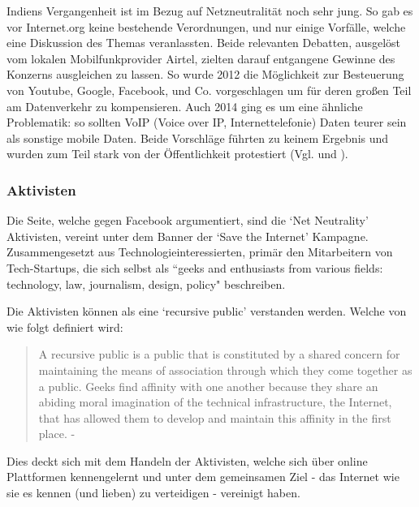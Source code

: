 \documentclass{article}
\begin{document}
\medskip

Indiens Vergangenheit ist im Bezug auf Netzneutralität noch sehr jung. So gab es vor Internet.org keine bestehende Verordnungen, und nur einige Vorfälle, welche eine Diskussion des Themas veranlassten.
Beide relevanten Debatten, ausgelöst vom lokalen Mobilfunkprovider Airtel, zielten darauf entgangene Gewinne des Konzerns ausgleichen zu lassen.
So wurde 2012 die Möglichkeit zur Besteuerung von Youtube, Google, Facebook, und Co. vorgeschlagen um für deren großen Teil am Datenverkehr zu kompensieren.
Auch 2014 ging es um eine ähnliche Problematik: so sollten VoIP (Voice over IP, Internettelefonie) Daten teurer sein als sonstige mobile Daten.
Beide Vorschläge führten zu keinem Ergebnis und wurden zum Teil stark von der Öffentlichkeit protestiert (Vgl. \textcite[253]{everydayLife} und \textcite{airtelVoip}).

\subsubsection{Aktivisten}

Die Seite, welche gegen Facebook argumentiert, sind die `Net Neutrality' Aktivisten, vereint unter dem Banner der `Save the Internet' Kampagne.
Zusammengesetzt aus Technologieinteressierten, primär den Mitarbeitern von Tech-Startups, die sich selbst als ``geeks and enthusiasts from various fields: technology, law, journalism, design, policy" \parencite{sti2015} beschreiben.

\medskip

Die Aktivisten können als eine `recursive public' verstanden werden. Welche von \textcite{twoBits} wie folgt definiert wird:

\medskip

\begin{quote}
A recursive public is a public that is constituted by a shared concern for maintaining the means of association through which they come together as a public.
Geeks find affinity with one another because they share an abiding moral imagination of the technical infrastructure, the Internet, that has allowed them to develop and maintain this affinity in the first place. - \cite[28]{twoBits}
\end{quote}

\medskip

Dies deckt sich mit dem Handeln der Aktivisten, welche sich über online Plattformen kennengelernt und unter dem gemeinsamen Ziel - das Internet wie sie es kennen (und lieben) zu verteidigen - vereinigt haben.
\end{document}
